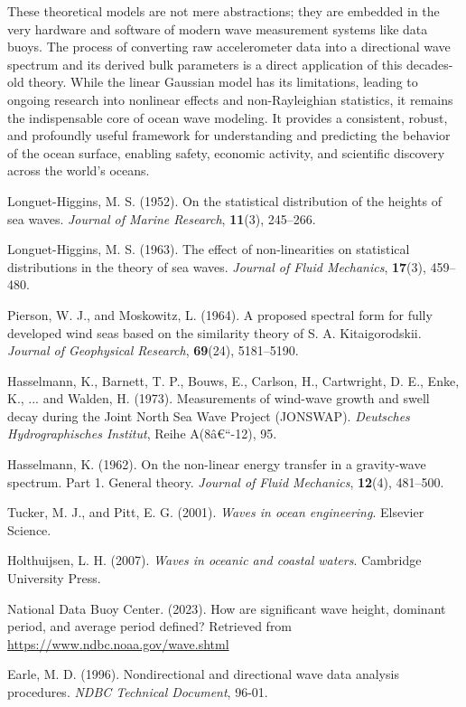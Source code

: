 \documentclass[12pt]{article}
\begin{document}
These theoretical models are not mere abstractions; they are embedded in the very hardware and software of modern wave measurement systems like data buoys. The process of converting raw accelerometer data into a directional wave spectrum and its derived bulk parameters is a direct application of this decades-old theory. While the linear Gaussian model has its limitations, leading to ongoing research into nonlinear effects and non-Rayleighian statistics, it remains the indispensable core of ocean wave modeling. It provides a consistent, robust, and profoundly useful framework for understanding and predicting the behavior of the ocean surface, enabling safety, economic activity, and scientific discovery across the world's oceans.

\begin{thebibliography}{99}

Longuet-Higgins, M. S. (1952).
On the statistical distribution of the heights of sea waves.
\textit{Journal of Marine Research}, \textbf{11}(3), 245–266.

Longuet-Higgins, M. S. (1963).
The effect of non-linearities on statistical distributions in the theory of sea waves.
\textit{Journal of Fluid Mechanics}, \textbf{17}(3), 459–480.

Pierson, W. J., and Moskowitz, L. (1964).
A proposed spectral form for fully developed wind seas based on the similarity theory of S. A. Kitaigorodskii.
\textit{Journal of Geophysical Research}, \textbf{69}(24), 5181–5190.

Hasselmann, K., Barnett, T. P., Bouws, E., Carlson, H., Cartwright, D. E., Enke, K., ... and Walden, H. (1973).
Measurements of wind-wave growth and swell decay during the Joint North Sea Wave Project (JONSWAP).
\textit{Deutsches Hydrographisches Institut}, Reihe A(8â€“-12), 95.

Hasselmann, K. (1962).
On the non-linear energy transfer in a gravity-wave spectrum. Part 1. General theory.
\textit{Journal of Fluid Mechanics}, \textbf{12}(4), 481–500.

Tucker, M. J., and Pitt, E. G. (2001).
\textit{Waves in ocean engineering}.
Elsevier Science.

Holthuijsen, L. H. (2007).
\textit{Waves in oceanic and coastal waters}.
Cambridge University Press.

National Data Buoy Center. (2023).
How are significant wave height, dominant period, and average period defined?
Retrieved from \url{https://www.ndbc.noaa.gov/wave.shtml}

Earle, M. D. (1996).
Nondirectional and directional wave data analysis procedures.
\textit{NDBC Technical Document}, 96-01.

\end{thebibliography}
\end{document}
